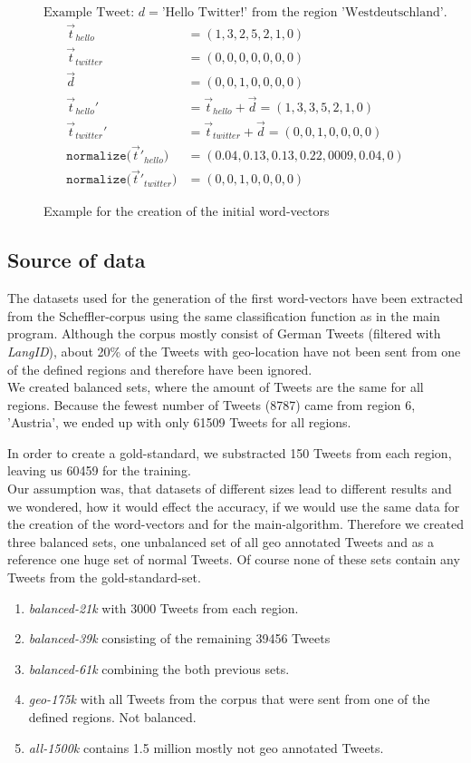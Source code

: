 \documentclass[../Main.tex]{subfiles}
\begin{document}
\begin{figure}
\centering $\textrm{Example Tweet: } d = \textrm{'Hello Twitter!'} \textrm{ from the region 'Westdeutschland'.}$
 \begin{align*}
    \vec{t}_{hello} &= (1,3,2,5,2,1,0) \\
     \vec{t}_{twitter} &= (0,0,0,0,0,0,0) \\
      \vec{d} &= (0,0,1,0,0,0,0) \\
     \vec{t}_{hello}' &= \vec{t}_{hello} + \vec{d} =  (1,3,3,5,2,1,0) \\
    \vec{t}_{twitter} ' &= \vec{t}_{twitter} + \vec{d} = (0,0,1,0,0,0,0) \\
     \texttt{normalize(}\vec{t}'_{hello}\texttt{)} &= (0.04, 0.13, 0.13, 0.22, 0009, 0.04, 0) \\
     \texttt{normalize(}\vec{t}'_{twitter}\texttt{)} &= (0,0,1,0,0,0,0)
  \end{align*}
  \caption{Example for the creation of the initial word-vectors}
  \label{geo_example1}
\end{figure}

\subsection{Source of data}
The datasets used for the generation of the first word-vectors have been extracted from the Scheffler-corpus using the same classification function as in the main program. Although the corpus mostly consist of German Tweets (filtered with \emph{LangID}), about 20\% of the Tweets with geo-location have not been sent from one of the defined regions and therefore have been ignored. \\
We created balanced sets, where the amount of  Tweets are the same for all regions. Because the fewest number of Tweets (8787) came from region 6, 'Austria', we ended up with only 61509 Tweets for all regions. 

In order to create a gold-standard, we substracted 150 Tweets from each region, leaving us 60459 for the training. \\
Our assumption was, that datasets of different sizes lead to different results and we wondered, how it would effect the accuracy, if we would use the same data for the creation of the word-vectors and for the main-algorithm. Therefore we created three balanced sets, one unbalanced set of all geo annotated Tweets and as a reference one huge set of normal Tweets. Of course none of these sets contain any Tweets from the gold-standard-set.
 \begin{enumerate}
\item \emph{balanced-21k} with 3000 Tweets from each region.
\item \emph{balanced-39k} consisting of the remaining 39456 Tweets
\item \emph{balanced-61k} combining the both previous sets. 
\item \emph{geo-175k} with all Tweets from the corpus that were sent from one of the defined regions. Not balanced.
\item \emph{all-1500k} contains 1.5 million mostly not geo annotated Tweets.
\end{enumerate}
\end{document}
